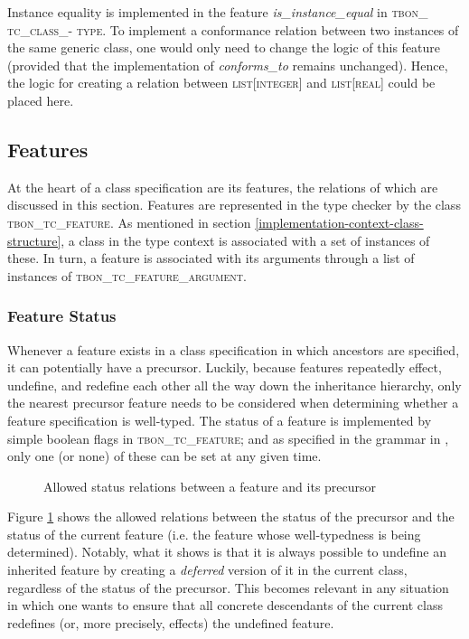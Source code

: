 Instance equality is implemented in the feature \textit{is\_instance\_equal} in \textsc{tbon\_ tc\_class\_- type}. To implement a conformance relation between two instances of the same generic class, one would only need to change the logic of this feature (provided that the implementation of \textit{conforms\_to} remains unchanged). Hence, the logic  for creating a relation between \textsc{list}[\textsc{integer}] and \textsc{list}[\textsc{real}] could be placed here.

\subsection{Features}
At the heart of a class specification are its features, the relations of which are discussed in this section. Features are represented in the type checker by the class \textsc{tbon\_tc\_feature}. As mentioned in section \ref{implementation-context-class-structure}, a class in the type context is associated with a set of instances of these. In turn, a feature is associated with its arguments through a list of instances of \textsc{tbon\_tc\_feature\_argument}. 
\subsubsection{Feature Status}
Whenever a feature exists in a class specification in which ancestors are specified, it can potentially have a precursor. Luckily, because features repeatedly effect, undefine, and redefine each other all the way down the inheritance hierarchy, only the nearest precursor feature needs to be considered when determining whether a feature specification is well-typed. The status of a feature is implemented by simple boolean flags in \textsc{tbon\_tc\_feature}; and as specified in the grammar in \cite{walden1995}, only one (or none) of these can be set at any given time.
\begin{figure}[H]
    \centerline{}
    \caption[Feature status matrix]{Allowed status relations between a feature and its precursor}
    \label{fig:feature_status}
\end{figure}
Figure \ref{fig:feature_status} shows the allowed relations between the status of the precursor and the status of the current feature (i.e. the feature whose well-typedness is being determined). Notably, what it shows is that it is always possible to undefine an inherited feature by creating a \textit{deferred} version of it in the current class, regardless of the status of the precursor. This becomes relevant in any situation in which one wants to ensure that all concrete descendants of the current class redefines (or, more precisely, effects) the undefined feature.

